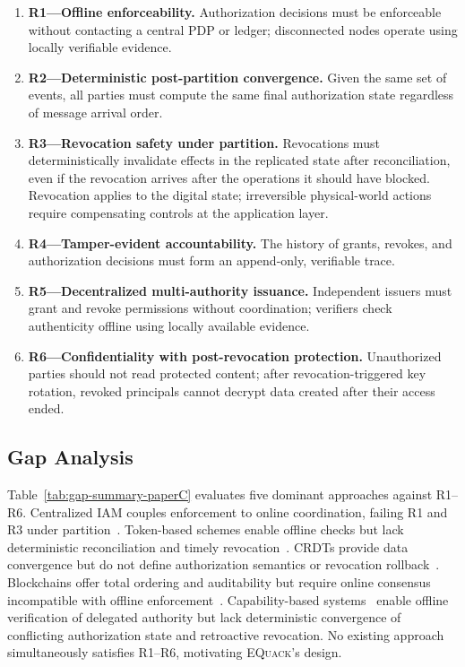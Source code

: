 \documentclass[10pt,journal,compsoc]{IEEEtran}
\newcommand{\equack}{\textsc{EQuack}}
\begin{document}
\begin{enumerate}
    \item \textbf{R1---Offline enforceability.} Authorization decisions must be enforceable without contacting a central PDP or ledger; disconnected nodes operate using locally verifiable evidence.
    \item \textbf{R2---Deterministic post-partition convergence.} Given the same set of events, all parties must compute the same final authorization state regardless of message arrival order.
    \item \textbf{R3---Revocation safety under partition.} Revocations must deterministically invalidate effects in the replicated state after reconciliation, even if the revocation arrives after the operations it should have blocked. Revocation applies to the digital state; irreversible physical-world actions require compensating controls at the application layer.
    \item \textbf{R4---Tamper-evident accountability.} The history of grants, revokes, and authorization decisions must form an append-only, verifiable trace.
    \item \textbf{R5---Decentralized multi-authority issuance.} Independent issuers must grant and revoke permissions without coordination; verifiers check authenticity offline using locally available evidence.
    \item \textbf{R6---Confidentiality with post-revocation protection.} Unauthorized parties should not read protected content; after revocation-triggered key rotation, revoked principals cannot decrypt data created after their access ended.
\end{enumerate}

\subsection{Gap Analysis}\label{subsec:gap-paperC}

Table~\ref{tab:gap-summary-paperC} evaluates five dominant approaches against R1--R6. Centralized IAM couples enforcement to online coordination, failing R1 and R3 under partition~\cite{jacob2024eventuallyac,nasab2023empirical,7442163}. Token-based schemes enable offline checks but lack deterministic reconciliation and timely revocation~\cite{rouhani2021distributed,SINGH2022102503,s21206815,8386853}. CRDTs provide data convergence but do not define authorization semantics or revocation rollback~\cite{shapiro2011crdt,gomes2017_sec}. Blockchains offer total ordering and auditability but require online consensus incompatible with offline enforcement~\cite{8989788,9020182,9446108,8798730,9548956,DIFRANCESCOMAESA201993,s20010282,s22031271}. Capability-based systems~\cite{birgisson2014macaroons,ucan2022,andersen2019wave} enable offline verification of delegated authority but lack deterministic convergence of conflicting authorization state and retroactive revocation. No existing approach simultaneously satisfies R1--R6, motivating \equack{}'s design.
\end{document}
